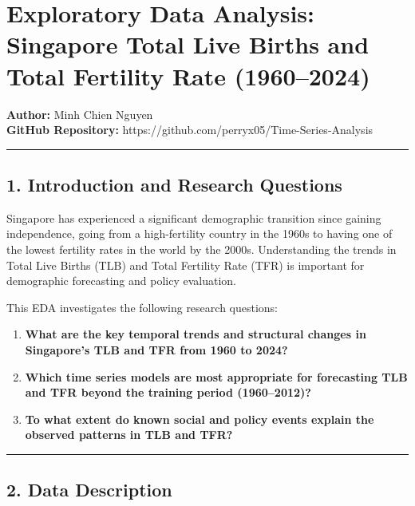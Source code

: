 \documentclass[
]{article}
\author{}
\date{}
\providecommand{\tightlist}{%
  \setlength{\itemsep}{0pt}\setlength{\parskip}{0pt}}
\begin{document}
\section{Exploratory Data Analysis: Singapore Total Live Births and
Total Fertility Rate
(1960--2024)}\label{exploratory-data-analysis-singapore-total-live-births-and-total-fertility-rate-19602024}

\textbf{Author:} Minh Chien Nguyen\\
\textbf{GitHub Repository:}
https://github.com/perryx05/Time-Series-Analysis

\begin{center}\rule{0.5\linewidth}{0.5pt}\end{center}

\subsection{1. Introduction and Research
Questions}\label{introduction-and-research-questions}

Singapore has experienced a significant demographic transition since
gaining independence, going from a high-fertility country in the 1960s
to having one of the lowest fertility rates in the world by the 2000s.
Understanding the trends in Total Live Births (TLB) and Total Fertility
Rate (TFR) is important for demographic forecasting and policy
evaluation.

This EDA investigates the following research questions:

\begin{enumerate}
\def\labelenumi{\arabic{enumi}.}
\tightlist
\item
  \textbf{What are the key temporal trends and structural changes in
  Singapore's TLB and TFR from 1960 to 2024?}
\item
  \textbf{Which time series models are most appropriate for forecasting
  TLB and TFR beyond the training period (1960--2012)?}
\item
  \textbf{To what extent do known social and policy events explain the
  observed patterns in TLB and TFR?}
\end{enumerate}

\begin{center}\rule{0.5\linewidth}{0.5pt}\end{center}

\subsection{2. Data Description}\label{data-description}
\end{document}

